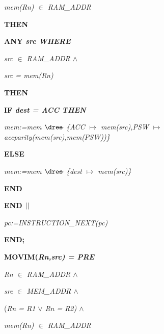 \begin{sloppypar}
\hspace*{0.20in}\it mem\rm (\it Rn\rm ) $\in$  \it RAM\_ADDR

\hspace*{0.10in}\bf THEN

\hspace*{0.20in}\bf ANY \it src \bf WHERE

\hspace*{0.30in}\it src $\in$  \it RAM\_ADDR  $\land$ 

\hspace*{0.30in}\it src \rm = \it mem\rm (\it Rn\rm )

\hspace*{0.20in}\bf THEN

\hspace*{0.30in}\bf IF \it dest \rm = \it ACC \bf THEN

\hspace*{0.40in}\it mem\rm :=\it mem $\lover$ \rm \{\it ACC $\mapsto$ \it mem\rm (\it src\rm )\rm ,\it PSW $\mapsto$ \it accparity\rm (\it mem\rm (\it src\rm )\rm ,\it mem\rm (\it PSW\rm )\rm )\rm \}

\hspace*{0.30in}\bf ELSE

\hspace*{0.40in}\it mem\rm :=\it mem $\lover$ \rm \{\it dest $\mapsto$ \it mem\rm (\it src\rm )\rm \}

\hspace*{0.30in}\bf END

\hspace*{0.20in}\bf END  $\mbox{$\mid\mid$}$ 

\hspace*{0.20in}\it pc\rm :=\it INSTRUCTION\_NEXT\rm (\it pc\rm )

\hspace*{0.10in}\bf END\rm ;

\hspace*{0.10in}\bf MOVIM\rm (\it Rn\rm ,\it src\rm ) \rm = \bf PRE

\hspace*{0.20in}\it Rn $\in$  \it RAM\_ADDR  $\land$ 

\hspace*{0.20in}\it src $\in$  \it MEM\_ADDR  $\land$ 

\hspace*{0.20in}\rm (\it Rn \rm = \it R1  $\lor$  \it Rn \rm = \it R2\rm )  $\land$ 

\hspace*{0.20in}\it mem\rm (\it Rn\rm ) $\in$  \it RAM\_ADDR


\end{sloppypar}
